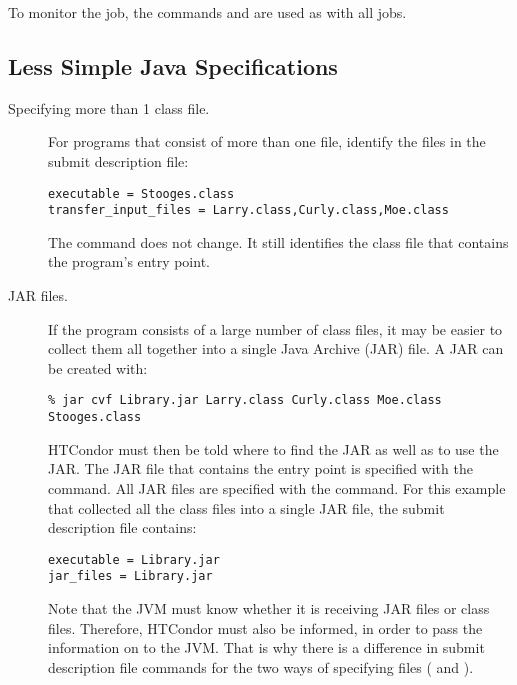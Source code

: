 To monitor the job, the commands  and 
are used as with all jobs.

\subsection{Less Simple Java Specifications}

\begin{description}
\item[Specifying more than 1 class file.]
For programs that 
consist of more than one  file,
identify the files in the submit description file:

\begin{verbatim}
executable = Stooges.class
transfer_input_files = Larry.class,Curly.class,Moe.class
\end{verbatim}

The  command does not change.
It still identifies the class file that contains the program's
entry point.

\item[JAR files.]
If the program consists of a large number of class files,
it may be easier to collect them all together into
a single Java Archive (JAR) file.
A JAR can be created with:

\footnotesize
\begin{verbatim}
% jar cvf Library.jar Larry.class Curly.class Moe.class Stooges.class
\end{verbatim}
\normalsize

HTCondor must then be told where to find the JAR as well
as to use the JAR. 
The JAR file that contains the entry point
is specified with the  command.
All JAR files are specified with the 
command.
For this example that collected all the class files
into a single JAR file, the submit description file contains:

\begin{verbatim}
executable = Library.jar
jar_files = Library.jar
\end{verbatim}

Note that the JVM must know whether it is receiving JAR files
or class files.
Therefore, HTCondor must also be informed, in order to pass the
information on to the JVM.
That is why there is a difference in submit description file commands
for the two ways of specifying files (
and ).


\end{description}

